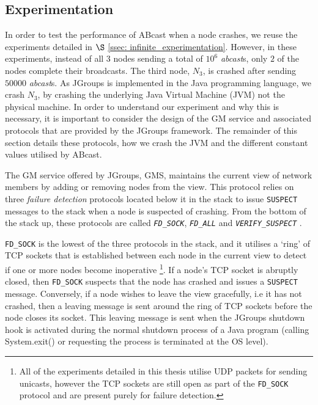     \subsection{Experimentation}\label{ssec:crash_experiment}
    In order to test the performance of \textsf{ABcast} when a node crashes, we reuse the experiments detailed in $\S$ \ref{ssec: infinite_experimentation}.  However, in these experiments, instead of all $3$ nodes sending a total of $10^6$ \emph{abcast}s, only $2$ of the nodes complete their broadcasts.  The third node, $N_3$, is crashed after sending $50000$ \emph{abcast}s.  As JGroups is implemented in the Java programming language, we crash $N_3$, by crashing the underlying Java Virtual Machine (JVM) not the physical machine.  In order to understand our experiment and why this is necessary, it is important to consider the design of the GM service and associated protocols that are provided by the JGroups framework.  The remainder of this section details these protocols, how we crash the JVM and the different constant values utilised by \textsf{ABcast}.  
    
    The GM service offered by JGroups, GMS, maintains the current view of network members by adding or removing nodes from the view.  This protocol relies on three \emph{failure detection} protocols located below it in the stack to issue \texttt{SUSPECT} messages to the stack when a node is suspected of crashing.  From the bottom of the stack up, these protocols are called \emph{\texttt{FD\_SOCK}}, \emph{\texttt{FD\_ALL}} and \emph{\texttt{VERIFY\_SUSPECT}} \citep{JGroups}.  
    
    \texttt{FD\_SOCK} is the lowest of the three protocols in the stack, and it utilises a \textquoteleft{}ring' of TCP sockets that is established between each node in the current view to detect if one or more nodes become inoperative \footnote{All of the experiments detailed in this thesis utilise UDP packets for sending unicasts, however the TCP sockets are still open as part of the \texttt{FD\_SOCK} protocol and are present purely for failure detection.}.  If a node's TCP socket is abruptly closed, then \texttt{FD\_SOCK} suspects that the node has crashed and issues a \texttt{SUSPECT} message.  Conversely, if a node wishes to leave the view gracefully, i.e it has not crashed, then a leaving message is sent around the ring of TCP sockets before the node closes its socket.    This leaving message is sent when the JGroups shutdown hook is activated during the normal shutdown process of a Java program (calling System.exit() or requesting the process is terminated at the OS level).  
    
